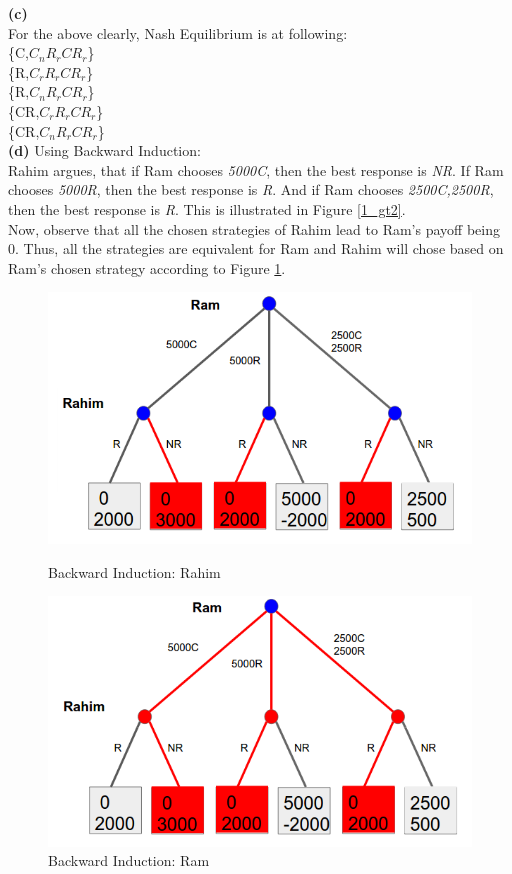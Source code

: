 \documentclass{article}
\begin{document}
\textbf{(c)} \\
For the above clearly, Nash Equilibrium is at following: \\
\{C,$C_nR_rCR_r$\} \\
\{R,$C_rR_rCR_r$\} \\
\{R,$C_nR_rCR_r$\} \\
\{CR,$C_rR_rCR_r$\} \\
\{CR,$C_nR_rCR_r$\} \\

\textbf{(d)} Using Backward Induction: \\
Rahim argues, that if Ram chooses \emph{5000C}, then the best response is \emph{NR}. If Ram chooses \emph{5000R}, then the best response is \emph{R}. And if Ram chooses \emph{2500C,2500R}, then the best response is \emph{R}. This is illustrated in Figure \ref{1_gt2}. \\
Now, observe that all the chosen strategies of Rahim lead to Ram's payoff being 0. Thus, all the strategies are equivalent for Ram and Rahim will chose based on Ram's chosen strategy according to Figure \ref{1_gt3}.

\begin{figure}[h!]
\centering
\begin{multicols}{2}
\includegraphics[width=1\columnwidth]{1_gt2.png}
\caption{Backward Induction: Rahim}
\label{1_gt2}


\includegraphics[width=1\columnwidth]{1_gt3.png}
\caption{Backward Induction: Ram}
\label{1_gt3}
\end{multicols}
\end{figure}
\end{document}
